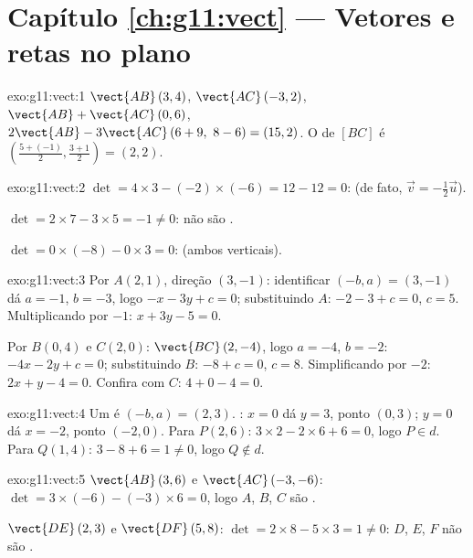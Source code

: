 \section*{Capítulo \ref{ch:g11:vect} --- Vetores e retas no plano}

\begin{solution}{exo:g11:vect:1}
$\vect{AB}\,(3, 4)$, $\vect{AC}\,(-3, 2)$,
$\vect{AB} + \vect{AC}\,(0, 6)$,
$2\vect{AB} - 3\vect{AC}\,(6 + 9,\ 8 - 6) = (15, 2)$. O  de
$[BC]$ é $\left(\frac{5 + (-1)}{2}, \frac{3+1}{2}\right) = (2, 2)$.
\end{solution}

\begin{solution}{exo:g11:vect:2}
$\det = 4 \times 3 - (-2) \times (-6) = 12 - 12 = 0$:  (de
fato, $\vec v = -\frac12 \vec u$).

$\det = 2 \times 7 - 3 \times 5 = -1 \neq 0$: não são .

$\det = 0 \times (-8) - 0 \times 3 = 0$:  (ambos verticais).
\end{solution}

\begin{solution}{exo:g11:vect:3}
Por $A(2,1)$, direção $(3, -1)$: identificar $(-b, a) = (3, -1)$ dá
$a = -1$, $b = -3$, logo $-x - 3y + c = 0$; substituindo $A$:
$-2 - 3 + c = 0$, $c = 5$. Multiplicando por $-1$: $x + 3y - 5 = 0$.

Por $B(0,4)$ e $C(2,0)$: $\vect{BC}\,(2, -4)$, logo $a = -4$, $b = -2$:
$-4x - 2y + c = 0$; substituindo $B$: $-8 + c = 0$, $c = 8$.
Simplificando por $-2$: $2x + y - 4 = 0$. Confira com $C$:
$4 + 0 - 4 = 0$.
\end{solution}

\begin{solution}{exo:g11:vect:4}
Um  é $(-b, a) = (2, 3)$. : $x = 0$ dá $y = 3$,
ponto $(0, 3)$; $y = 0$ dá $x = -2$, ponto $(-2, 0)$. Para $P(2,6)$:
$3 \times 2 - 2 \times 6 + 6 = 0$, logo $P \in d$. Para $Q(1,4)$:
$3 - 8 + 6 = 1 \neq 0$, logo $Q \notin d$.
\end{solution}

\begin{solution}{exo:g11:vect:5}
$\vect{AB}\,(3, 6)$ e $\vect{AC}\,(-3, -6)$:
$\det = 3 \times (-6) - (-3) \times 6 = 0$, logo $A$, $B$, $C$ são
.

$\vect{DE}\,(2, 3)$ e $\vect{DF}\,(5, 8)$:
$\det = 2 \times 8 - 5 \times 3 = 1 \neq 0$: $D$, $E$, $F$ não são
.
\end{solution}


